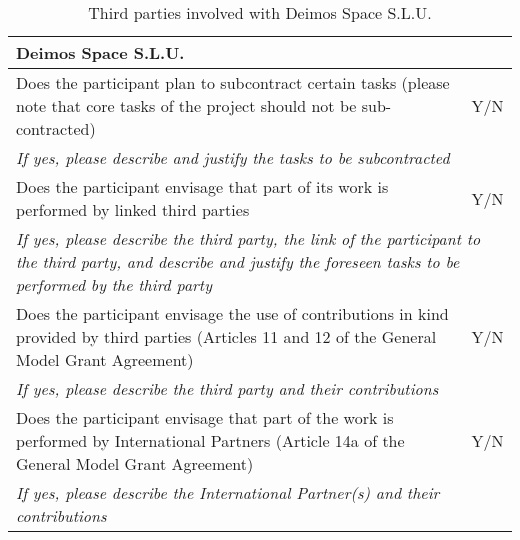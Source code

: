 \begin{table}[H]
	\centering
	\begin{tabular}{|p{10cm}|p{4cm}|}
		\hline
		
		\multicolumn{2}{|p{14cm}|}{\textbf{Deimos Space S.L.U.}}\\
		
		\hline
		
		Does the participant plan to subcontract certain tasks (please note that core tasks of the project should not be sub-contracted) & Y/N\\
		
		\hline
		
		\multicolumn{2}{|p{14cm}|}{\textit{If yes, please describe and justify the tasks to be subcontracted}}\\
		
		\hline
		
		Does the participant envisage that part of its work is performed by linked third parties & Y/N\\
		
		\hline
		
		\multicolumn{2}{|p{14cm}|}{\textit{If yes, please describe the third party, the link of the participant to the third party, and describe and justify the foreseen tasks to be performed by the third party}}\\
		
		\hline
		
		Does the participant envisage the use of contributions in kind provided by third parties (Articles 11 and 12 of the General Model Grant Agreement) & Y/N\\
		
		\hline
		
		\multicolumn{2}{|p{14cm}|}{\textit{If yes, please describe the third party and their contributions}}\\
		
		\hline
		
		Does the participant envisage that part of the work is performed by International Partners (Article 14a of the General Model Grant Agreement) & Y/N\\
		
		\hline
		
		\multicolumn{2}{|p{14cm}|}{\textit{If yes, please describe the International Partner(s) and their contributions}}\\
		
		\hline
	\end{tabular}
	\caption{Third parties involved with Deimos Space S.L.U.}
\end{table}



